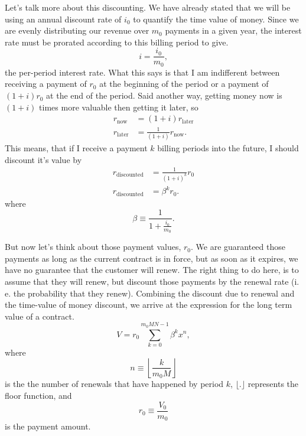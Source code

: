 \documentclass[paper=a4, fontsize=11pt abstract]{scrartcl}
\numberwithin{equation}{section}		%
\numberwithin{figure}{section}			%
\numberwithin{table}{section}				%
\begin{document}
Let's talk more about this discounting. We have already stated that we will be using an annual discount rate of $i_0$ to quantify the time value of money.  Since we are evenly distributing our revenue over $m_0$ payments in a given year, the interest rate must be prorated according to this billing period to give.
\begin{equation}
    i = \frac{i_0}{m_0},
\end{equation}
the per-period interest rate.  What this says is that I am indifferent between receiving a payment of $r_0$ at the beginning of the period or a payment of $(1 + i) r_0$ at the end of the period. Said another way, getting money now is  $(1 + i)$ times more valuable then getting it later, so 
\begin{align}
    r_\textrm{now} &= (1 + i) r_\textrm{later} \\
    r_\textrm{later} &= \frac{1}{(1 + i)} r_\textrm{now}.
\end{align}
This means, that if I receive a payment $k$ billing periods into the future, I should discount it's value by
\begin{align}
    r_\textrm{discounted} &= \frac{1}{(1 + i)^k} r_0 \\
    r_\textrm{discounted} &= \beta^k r_0.
\end{align}
where
\begin{equation}
    \beta \equiv \frac{1}{1 + \frac{i_0}{m_0}}.
\end{equation}

But now let's think about those payment values, $r_0$.  We are guaranteed those payments as long as the current contract is in force, but as soon as it expires, we have no guarantee that the customer will renew.  The right thing to do here, is to assume that they will renew, but discount those payments by the renewal rate (i. e. the probability that they renew). Combining the discount due to renewal and the time-value of money discount, we arrive at the expression for the long term value of a contract.
\begin{equation}
    V = r_0\sum_{k=0}^{m_0 M N - 1} \beta^k x^n, \label{eq.ltv_pre_split}
\end{equation}
where
\begin{equation}
    n \equiv \left\lfloor\frac{k}{m_0 M} \right\rfloor  \nonumber
\end{equation}
is the the number of renewals that have happened by period $k$, $\lfloor . \rfloor$ represents the floor function, and
\begin{equation}
    r_0 \equiv \frac{V_0}{m_0} \nonumber
\end{equation}
is the payment amount.
\end{document}
